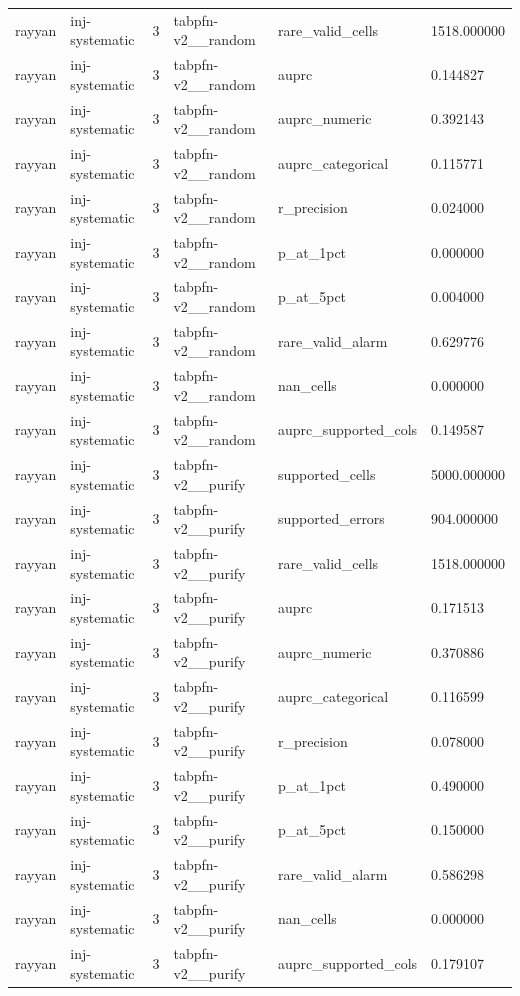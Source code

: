 \begin{tabular}{llllll}
rayyan & inj-systematic & 3 & tabpfn-v2\_\_random & rare\_valid\_cells & 1518.000000 \\
rayyan & inj-systematic & 3 & tabpfn-v2\_\_random & auprc & 0.144827 \\
rayyan & inj-systematic & 3 & tabpfn-v2\_\_random & auprc\_numeric & 0.392143 \\
rayyan & inj-systematic & 3 & tabpfn-v2\_\_random & auprc\_categorical & 0.115771 \\
rayyan & inj-systematic & 3 & tabpfn-v2\_\_random & r\_precision & 0.024000 \\
rayyan & inj-systematic & 3 & tabpfn-v2\_\_random & p\_at\_1pct & 0.000000 \\
rayyan & inj-systematic & 3 & tabpfn-v2\_\_random & p\_at\_5pct & 0.004000 \\
rayyan & inj-systematic & 3 & tabpfn-v2\_\_random & rare\_valid\_alarm & 0.629776 \\
rayyan & inj-systematic & 3 & tabpfn-v2\_\_random & nan\_cells & 0.000000 \\
rayyan & inj-systematic & 3 & tabpfn-v2\_\_random & auprc\_supported\_cols & 0.149587 \\
rayyan & inj-systematic & 3 & tabpfn-v2\_\_purify & supported\_cells & 5000.000000 \\
rayyan & inj-systematic & 3 & tabpfn-v2\_\_purify & supported\_errors & 904.000000 \\
rayyan & inj-systematic & 3 & tabpfn-v2\_\_purify & rare\_valid\_cells & 1518.000000 \\
rayyan & inj-systematic & 3 & tabpfn-v2\_\_purify & auprc & 0.171513 \\
rayyan & inj-systematic & 3 & tabpfn-v2\_\_purify & auprc\_numeric & 0.370886 \\
rayyan & inj-systematic & 3 & tabpfn-v2\_\_purify & auprc\_categorical & 0.116599 \\
rayyan & inj-systematic & 3 & tabpfn-v2\_\_purify & r\_precision & 0.078000 \\
rayyan & inj-systematic & 3 & tabpfn-v2\_\_purify & p\_at\_1pct & 0.490000 \\
rayyan & inj-systematic & 3 & tabpfn-v2\_\_purify & p\_at\_5pct & 0.150000 \\
rayyan & inj-systematic & 3 & tabpfn-v2\_\_purify & rare\_valid\_alarm & 0.586298 \\
rayyan & inj-systematic & 3 & tabpfn-v2\_\_purify & nan\_cells & 0.000000 \\
rayyan & inj-systematic & 3 & tabpfn-v2\_\_purify & auprc\_supported\_cols & 0.179107 \\

\end{tabular}
